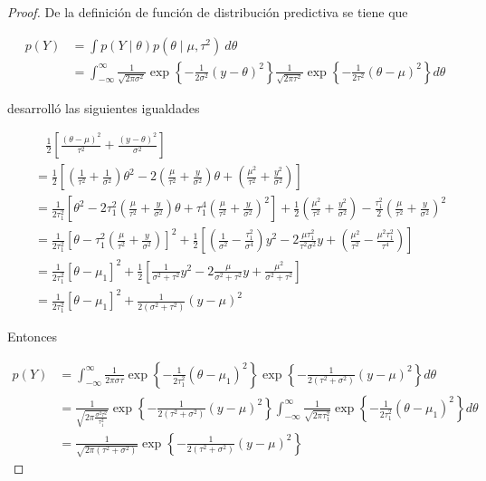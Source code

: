 \documentclass[
  10pt,
  spanish,
]{book}
\theoremstyle{definition}
\theoremstyle{definition}
\theoremstyle{definition}
\theoremstyle{definition}
\theoremstyle{remark}
\begin{document}
\begin{proof}
{}De la definición de función de distribución predictiva se tiene que

\begin{align*}
p(Y)&=\int p(Y \mid \theta)p(\theta \mid \mu,\tau^2)\ d\theta\\
&=\int_{-\infty}^{\infty} \frac{1}{\sqrt{2\pi\sigma^2}}\exp\left\{-\frac{1}{2\sigma^2}(y-\theta)^2\right\}
\frac{1}{\sqrt{2\pi\tau^2}}\exp\left\{-\frac{1}{2\tau^2}(\theta-\mu)^2\right\}d\theta
\end{align*}

\citet{Berger} desarrolló las siguientes igualdades

\begin{align*}
&\ \ \ \ \frac{1}{2}\left[\frac{(\theta-\mu)^2}{\tau^2}+\frac{(y-\theta)^2}{\sigma^2}\right]\\
&=\frac{1}{2}\left[\left(\frac{1}{\tau^2}+\frac{1}{\sigma^2}\right)\theta^2-2\left(\frac{\mu}{\tau^2}+\frac{y}{\sigma^2}\right)\theta+\left(\frac{\mu^2}{\tau^2}+\frac{y^2}{\sigma^2}\right)\right]\\
&=\frac{1}{2\tau_1^2}\left[\theta^2-2\tau_1^2\left(\frac{\mu}{\tau^2}+\frac{y}{\sigma^2}\right)\theta+\tau_1^4\left(\frac{\mu}{\tau^2}+\frac{y}{\sigma^2}\right)^2\right]+\frac{1}{2}\left(\frac{\mu^2}{\tau^2}+\frac{y^2}{\sigma^2}\right)-\frac{\tau_1^2}{2}\left(\frac{\mu}{\tau^2}+\frac{y}{\sigma^2}\right)^2\\
&=\frac{1}{2\tau_1^2}\left[\theta-\tau_1^2\left(\frac{\mu}{\tau^2}+\frac{y}{\sigma^2}\right)\right]^2+\frac{1}{2}\left[\left(\frac{1}{\sigma^2}-\frac{\tau_1^2}{\sigma^4}\right)y^2-2\frac{\mu\tau_1^2}{\tau^2\sigma^2}y+\left(\frac{\mu^2}{\tau^2}-\frac{\mu^2\tau_1^2}{\tau^4}\right)\right]\\
&=\frac{1}{2\tau_1^2}\left[\theta-\mu_1\right]^2+\frac{1}{2}\left[\frac{1}{\sigma^2+\tau^2}y^2-2\frac{\mu}{\sigma^2+\tau^2}y+\frac{\mu^2}{\sigma^2+\tau^2}\right]\\
&=\frac{1}{2\tau_1^2}\left[\theta-\mu_1\right]^2+\frac{1}{2(\sigma^2+\tau^2)}(y-\mu)^2
\end{align*}

Entonces

\begin{align*}
p(Y)&=\int_{-\infty}^{\infty} \frac{1}{2\pi\sigma\tau}\exp\left\{-\frac{1}{2\tau_1^2}(\theta-\mu_1)^2\right\}
\exp\left\{-\frac{1}{2(\tau^2+\sigma^2)}(y-\mu)^2\right\}d\theta\\
&= \frac{1}{\sqrt{2\pi\frac{\sigma^2\tau^2}{\tau_1^2}}}\exp\left\{-\frac{1}{2(\tau^2+\sigma^2)}(y-\mu)^2\right\}
\int_{-\infty}^{\infty} \frac{1}{\sqrt{2\pi\tau_1^2}}\exp\left\{-\frac{1}{2\tau_1^2}(\theta-\mu_1)^2\right\}d\theta\\
&= \frac{1}{\sqrt{2\pi(\tau^2+\sigma^2)}}\exp\left\{-\frac{1}{2(\tau^2+\sigma^2)}(y-\mu)^2\right\}
\end{align*}
\end{proof}
\end{document}
